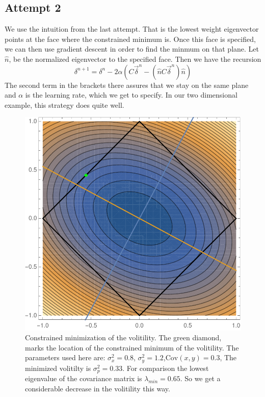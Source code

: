 \documentclass[10pt,letterpaper,oneside]{article}
\begin{document}
\subsection{Attempt 2}
We use the intuition from the last attempt. That is the lowest weight eigenvector points at the face where the constrained minimum is. Once this face is specified, we can then use gradient descent in order to find the minmum on that plane. Let $\hat{n}$, be the normalized eigenvector to the specified face. Then we have the recursion
\begin{equation}
\delta^{n+1}=\delta^{n}-2 \alpha\left(C \vec{\delta}^n-(\hat{n}C \vec{\delta}^n)\hat{n}\right)
\end{equation}
The second term in the brackets there assures that we stay on the same plane and $\alpha$ is the learning rate, which we get to specify. In our two dimensional example, this strategy does quite well.

\begin{figure}[H]
\includegraphics[scale=1]{Mined}
\caption{Constrained minimization of the volitility. The green diamond, marks the location of the constrained minimum of the volitility. The parameters used here are: $\sigma_x^2=0.8$, $\sigma_y^2=1.2$,$\text{Cov}(x,y)=0.3$, The minimized volitilty is $\sigma_p^2=0.33$. For comparison the lowest eigenvalue of the covariance matrix is $\lambda_{min}=0.65$. So we get a considerable decrease in the volitility this way.}
\end{figure}
\end{document}
